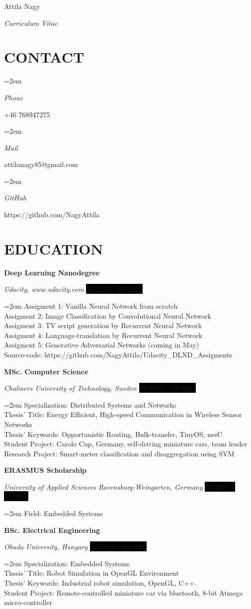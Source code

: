 \documentclass[paper=a4,fontsize=11pt]{scrartcl}	 			%
\newlength{\spacebox}
\newcommand{\sepspace}{\vspace*{1em}}			%
\newcommand{\MyName}[1]{
		\Huge \usefont{OT1}{phv}{b}{n} \hfill #1 		%
		\par \normalsize \normalfont}
\newcommand{\MySlogan}[1]{
		\large \usefont{OT1}{phv}{m}{n}\hfill \textit{#1} %
		\par \normalsize \normalfont}
\newcommand{\NewPart}[1]{\section*{\uppercase{#1}}}
\newcommand{\PersonalEntry}[2]{
		\noindent\hangindent=2em\hangafter=0 		%
		\parbox{\spacebox}{						%
		\textit{#1}}								%
		\hspace{1.5em} #2 \par}					%
\newcommand{\EducationEntry}[4]{
		\noindent \textbf{#1} \par 					%
		\noindent \textit{#3} \hfill					%
		\colorbox{Black}{%
			\hfill\color{White}#2} \par				%
		\noindent\hangindent=2em\hangafter=0 \small #4 	%
		\normalsize \par
    }
\begin{document}
\MyName{Attila Nagy}
\MySlogan{Curriculum Vitae}

\NewPart{Contact}{}

\PersonalEntry{Phone}{+46 768947275}
\PersonalEntry{Mail}{attilanagy85@gmail.com}
\PersonalEntry{GitHub}{https://github.com/NagyAttila}

\NewPart{Education}{}

\EducationEntry{Deep Learning Nanodegree}{01/2017 -- 06/2017}
{Udacity, www.udacity.com} {Assigment 1: Vanilla Neural Network from scratch\\
 Assigment 2: Image Classification by Convolutional Neural Network\\
 Assigment 3: TV script generation by Recurrent Neural Network\\
 Assigment 4: Language-translation by Recurrent Neural Network\\
 Assigment 5: Generative Adversarial Networks (coming in May)\\
 Source-code: https://github.com/NagyAttila/Udacity\_DLND\_Assigments }
\sepspace


\EducationEntry{MSc. Computer Science}{09/2012 -- 04/2014}
  {Chalmers University of Technology, Sweden}{Specialization: Distributed Systems and Networks\\
  Thesis' Title: Energy Efficient, High-speed Communication in Wireless Sensor Networks\\
  Thesis' Keywords: Opportunistic Routing, Bulk-transfer, TinyOS, nesC\\
  Student Project: Carolo Cup, Germany, self-driving miniature cars, team leader\\
  Research Project: Smart-meter classification and disaggregation using SVM}
\sepspace

\EducationEntry{ERASMUS Scholarship}{09/2008 -- 01/2009}
{University of Applied Sciences Ravensburg-Weingarten, Germany}
{Field: Embedded Systems }
\sepspace

\EducationEntry{BSc. Electrical Engineering}{09/2004 -- 06/2009}{Obuda University, Hungary}{Specialization: Embedded Systems\\
Thesis' Title: Robot Simulation in OpenGL Environment\\
Thesis' Keywords: Industrial robot simulation, OpenGL, C++. \\
Student Project: Remote-controlled miniature car via bluetooth, 8-bit Atmega micro-controller}
\end{document}
